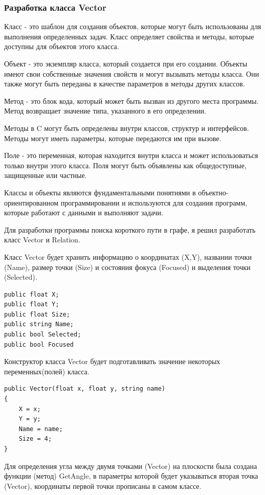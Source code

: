 \documentclass[a4paper,14pt, Times New Roman]{extarticle}
\begin{document}
\subsubsection{Разработка класса Vector}
Класс - это шаблон для создания объектов, которые могут быть использованы для выполнения определенных задач. Класс определяет свойства и методы, которые доступны для объектов этого класса.

Объект - это экземпляр класса, который создается при его создании. Объекты имеют свои собственные значения свойств и могут вызывать методы класса. Они также могут быть переданы в качестве параметров в методы других классов.

Метод - это блок кода, который может быть вызван из другого места программы. Метод возвращает значение типа, указанного в его определении.

Методы в C могут быть определены внутри классов, структур и интерфейсов. Методы могут иметь параметры, которые передаются им при вызове.

Поле - это переменная, которая находится внутри класса и может использоваться только внутри этого класса. Поля могут быть объявлены как общедоступные, защищенные или частные.

Классы и объекты являются фундаментальными понятиями в объектно-ориентированном программировании и используются для создания программ, которые работают с данными и выполняют задачи.

Для разработки программы поиска короткого пути в графе, я решил разработать класс Vector и Relation.

Класс Vector будет хранить информацию о координатах (X,Y), названии точки (Name), размер точки (Size) и состояния фокуса (Focused) и выделения точки (Selected).

\begin{lstlisting}
public float X;
public float Y;
public float Size;
public string Name;
public bool Selected;
public bool Focused
\end{lstlisting}

Конструктор класса Vector будет подготавливать значение некоторых переменных(полей) класса.

\begin{lstlisting}
public Vector(float x, float y, string name)
{
    X = x;
    Y = y;
    Name = name;
    Size = 4;
}
\end{lstlisting}

Для определения угла между двумя точками (Vector) на плоскости была создана функции (метод) GetAngle, в параметры которой будет указываться вторая точка (Vector), координаты первой точки прописаны в самом классе.
\end{document}
